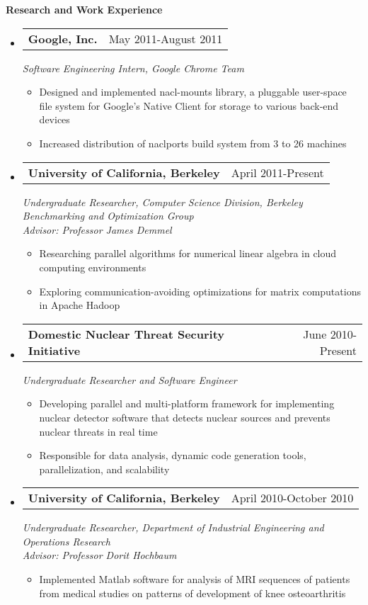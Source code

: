 \documentclass[letterpaper,11pt]{article}
\makeatletter
\newcommand{\resitem}[1]{\item #1 \vspace{-2pt}}
\newcommand{\resheading}[1]{{\large \colorbox{mygrey}{\begin{minipage}{\textwidth}{\textbf{#1 \vphantom{p\^{E}}}}\end{minipage}}}}
\newcommand{\expsubheading}[3]{
\begin{tabular*}{7.0in}{l@{\extracolsep{\fill}}r}
		\textbf{#1} & #2 \\
\end{tabular*}
\emph{#3}
\vspace{-6pt}
}
\makeatother
\begin{document}
\resheading{Research and Work Experience}
\begin{itemize}
\item
     \expsubheading{Google, Inc.}{May 2011-August 2011}{Software Engineering Intern, Google Chrome Team}
     \begin{itemize}
         \resitem{Designed and implemented nacl-mounts library, a pluggable user-space file system for Google's Native Client for storage to various back-end devices}
         \resitem{Increased distribution of naclports build system from 3 to 26 machines}
     \end{itemize}
     
\item
   \expsubheading{University of California, Berkeley}{April 2011-Present}{Undergraduate Researcher, Computer Science Division, Berkeley Benchmarking and Optimization Group \\
   Advisor: Professor James Demmel}
    \begin{itemize}
             \resitem{Researching parallel algorithms for numerical linear algebra in cloud computing environments}
         \resitem{Exploring communication-avoiding optimizations for matrix computations in Apache Hadoop}
     \end{itemize}
     
\item
    \expsubheading{Domestic Nuclear Threat Security Initiative}{June 2010-Present}{Undergraduate Researcher and Software Engineer}
    \begin{itemize}
         \resitem{Developing parallel and multi-platform framework for implementing nuclear detector software that detects nuclear sources and prevents nuclear threats in real time}
         \resitem{Responsible for data analysis, dynamic code generation tools, parallelization, and scalability}
     \end{itemize}    
     
\item
   \expsubheading{University of California, Berkeley}{April 2010-October 2010}{Undergraduate Researcher, Department of Industrial Engineering and Operations Research \\
   Advisor: Professor Dorit Hochbaum}
    \begin{itemize}
         \resitem{Implemented Matlab software for analysis of MRI sequences of patients from medical studies on patterns of development of knee osteoarthritis}
     \end{itemize}
\end{itemize}
\end{document}
